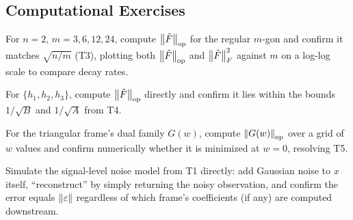 \subsection*{Computational Exercises}
\begin{compexercises}
	\item For $n=2$, $m=3,6,12,24$, compute $\left\| \tilde F \right\|_{\mathrm{op}}$
	for the regular $m$-gon and confirm it matches $\sqrt{n/m}$
	(T3), plotting both $\left\| \tilde F \right\|_{\mathrm{op}}$ and
	$\left\| \tilde F \right\|_F^2$ against $m$ on a log-log scale to compare
	decay rates.
	
	\item For $\{h_1,h_2,h_3\}$, compute $\left\| \tilde F \right\|_{\mathrm{op}}$
	directly and confirm it lies within the bounds $1/\sqrt B$ and
	$1/\sqrt A$ from T4.
	
	\item For the triangular frame's dual family $G(w)$, compute
	$\left\| G(w) \right\|_{\mathrm{op}}$ over a grid of $w$ values and confirm
	numerically whether it is minimized at $w=0$, resolving T5.
	
	\item Simulate the signal-level noise model from T1 directly: add
	Gaussian noise to $x$ itself, ``reconstruct'' by simply returning
	the noisy observation, and confirm the error equals
	$\left\| \varepsilon \right\|$ regardless of which frame's coefficients (if
	any) are computed downstream.
\end{compexercises}